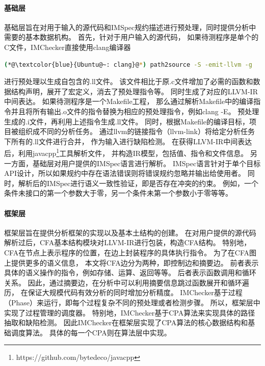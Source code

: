 \paragraph{基础层}
基础层旨在对用于输入的源代码和IMSpec规约描述进行预处理，同时提供分析中需要的基本数据机构。
首先，针对于用户输入的源代码，
如果待测程序是单个的C文件，IMChecker直接使用clang编译器
\begin{lstlisting}[language={bash},
basicstyle=\linespread{0.8}\listingsfont,
numbers=none,
xleftmargin=.25\textwidth]
(*@\textcolor{blue}{Ubuntu@~: clang}@*) path2source -S -emit-llvm -g
\end{lstlisting}
进行预处理以生成自包含的.ll文件。
该文件相比于原.c文件增加了必需的函数和数据结构声明，展开了宏定义，消去了预处理指令等。
同时生成了对应的LLVM-IR中间表达。
如果待测程序是一个Makefile工程，
那么通过解析Makefile中的编译指令并且将所有输出.o文件的指令替换为相应的预处理指令，例如clang -E。
预处理生成的.i文件，再利用上述指令生成.ll文件。
同时，根据Makefile的编译目标，项目被组织成不同的分析任务。
通过llvm的链接指令（llvm-link）将给定分析任务下所有的.ll文件进行合并，
作为输入进行缺陷检测。
在获得LLVM-IR中间表达后，利用javacpp\footnote{https://github.com/bytedeco/javacpp}工具解析文件，
并构造IR模型，包括值、指令和文件信息。
另一方面，基础层对用户提供的IMSpec语言进行解析。
IMSpec语言针对于单个目标API设计，所以如果规约中存在语法错误则将错误规约忽略并输出给使用者。
同时，解析后的IMSpec进行语义一致性验证，即是否存在冲突的约束。
例如，一个条件未接口的第一个参数大于零，另一个条件未第一个参数小于零等等。

\paragraph{框架层}
框架层旨在提供分析框架的实现以及基本土结构的创建。
在对用户提供的源代码解析过后，CFA基本结构模块对LLVM-IR进行包装，构造CFA结构。
特别地，CFA在节点上表示程序的位置，在边上封装程序的具体执行指令。
为了在CFA图上提供更多的语义信息，
本文将CFA边分为两种，即控制边和摘要边。
前者表示具体的语义操作的指令，例如存储、运算、返回等等。
后者表示函数调用和循环关系。
因此，通过摘要边，在分析中可以利用摘要信息跳过函数展开和循环遍历，
在保证大规模代码有效分析的同时增加分析精度。
IMChecker基于过程（Phase）来运行，即每个过程复杂不同的预处理或者检测步骤。
所以，框架层中实现了过程管理的调度器。
特别地，IMChecker基于CPA算法来实现具体的路径抽取和缺陷检测。
因此IMChecker在框架层实现了CPA算法的核心数据结构和基础调度算法。
具体的每一个CPA则在算法层中实现。

